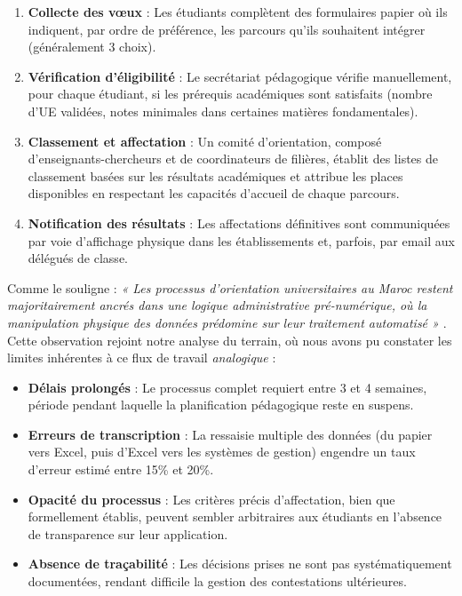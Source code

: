 \documentclass[french,12pt]{report} %
\begin{document}
\begin{enumerate}
    \item \textbf{Collecte des vœux} : Les étudiants complètent des formulaires papier où ils indiquent, par ordre de préférence, les parcours qu'ils souhaitent intégrer (généralement 3 choix).
    
    \item \textbf{Vérification d'éligibilité} : Le secrétariat pédagogique vérifie manuellement, pour chaque étudiant, si les prérequis académiques sont satisfaits (nombre d'UE validées, notes minimales dans certaines matières fondamentales).
    
    \item \textbf{Classement et affectation} : Un comité d'orientation, composé d'enseignants-chercheurs et de coordinateurs de filières, établit des listes de classement basées sur les résultats académiques et attribue les places disponibles en respectant les capacités d'accueil de chaque parcours.
    
    \item \textbf{Notification des résultats} : Les affectations définitives sont communiquées par voie d'affichage physique dans les établissements et, parfois, par email aux délégués de classe.
\end{enumerate}

Comme le souligne \citeauthor{Bensouda2023} : \textit{« Les processus d'orientation universitaires au Maroc restent majoritairement ancrés dans une logique administrative pré-numérique, où la manipulation physique des données prédomine sur leur traitement automatisé »} \cite{Bensouda2023}. Cette observation rejoint notre analyse du terrain, où nous avons pu constater les limites inhérentes à ce flux de travail \textit{analogique} :

\begin{itemize}
    \item \textbf{Délais prolongés} : Le processus complet requiert entre 3 et 4 semaines, période pendant laquelle la planification pédagogique reste en suspens.
    \item \textbf{Erreurs de transcription} : La ressaisie multiple des données (du papier vers Excel, puis d'Excel vers les systèmes de gestion) engendre un taux d'erreur estimé entre 15\% et 20\%.
    \item \textbf{Opacité du processus} : Les critères précis d'affectation, bien que formellement établis, peuvent sembler arbitraires aux étudiants en l'absence de transparence sur leur application.
    \item \textbf{Absence de traçabilité} : Les décisions prises ne sont pas systématiquement documentées, rendant difficile la gestion des contestations ultérieures.
\end{itemize}
\end{document}

